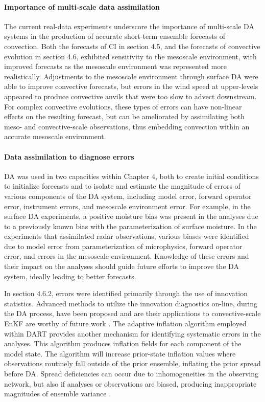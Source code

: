 \paragraph{Importance of multi-scale data assimilation}
The current real-data experiments underscore the importance of multi-scale DA systems in the production of accurate short-term ensemble forecasts of convection. Both the forecasts of CI in section 4.5, and the forecasts of convective evolution in section 4.6, exhibited sensitivity to the mesoscale environment, with improved forecasts as the mesoscale environment was represented more realistically. Adjustments to the mesoscale environment through surface DA were able to improve convective forecasts, but errors in the wind speed at upper-levels appeared to produce convective anvils that were too slow to advect downstream. For complex convective evolutions, these types of errors can have non-linear effects on the resulting forecast, but can be ameliorated by assimilating both meso- and convective-scale observations, thus embedding convection within an accurate mesoscale environment.

\paragraph{Data assimilation to diagnose errors}
DA was used in two capacities within Chapter 4, both to create initial conditions to initialize forecasts and to isolate and estimate the magnitude of errors of various components of the DA system, including model error, forward operator error, instrument errors, and mesoscale environment error. For example, in the surface DA experiments, a positive moisture bias was present in the analyses due to a previously known bias with the parameterization of surface moisture. In the experiments that assimilated radar observations, various biases were identified due to model error from parameterization of microphysics, forward operator error, and errors in the mesoscale environment. Knowledge of these errors and their impact on the analyses should guide future efforts to improve the DA system, ideally leading to better forecasts.

In section 4.6.2, errors were identified primarily through the use of innovation statistics. Advanced methods to utilize the innovation diagnostics on-line, during the DA process, have been proposed and are their applications to convective-scale EnKF are worthy of future work \citep{deedasilva98}. The adaptive inflation algorithm employed within DART provides another mechanism for identifying systematic errors in the analyses. This algorithm produces inflation fields for each component of the model state. The algorithm will increase prior-state inflation values where observations routinely fall outside of the prior ensemble, inflating the prior spread before DA. Spread deficiencies can occur due to inhomogeneities in the observing network, but also if analyses or observations are biased, producing inappropriate magnitudes of ensemble variance \citep{anderson09}.

